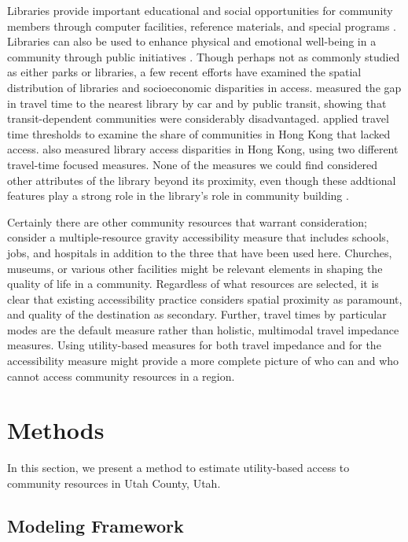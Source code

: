 \documentclass[ijerph,article,submit,moreauthors,pdftex]{mdpi}
\begin{document}
Libraries provide important educational and social opportunities for community
members through computer facilities, reference materials, and special programs
\citep{maxwell2008libraries, barclay2017space}. Libraries can also be used to
enhance physical and emotional well-being in a community through public
initiatives \citep{philbin2019}. Though perhaps not as commonly studied as either
parks or libraries, a few recent efforts have examined the spatial distribution
of libraries and socioeconomic disparities in access. \citet{allen2019} measured the
gap in travel time to the nearest library by car and by public transit, showing
that transit-dependent communities were considerably disadvantaged. \citet{cheng2021}
applied travel time thresholds to examine the share of communities in Hong Kong
that lacked access. \citet{guo2017} also measured library access disparities in Hong Kong,
using two different travel-time focused measures. None of the measures we could
find considered other attributes of the library beyond its proximity, even though
these addtional features play a strong role in the library's role in community building
\citep{barclay2017space}.

Certainly there are other community resources that warrant consideration;
\citet{ermagun2020} consider a multiple-resource gravity accessibility measure that
includes schools, jobs, and hospitals in addition to the three that have been used here.
Churches, museums, or various other facilities might be relevant elements
in shaping the quality of life in a community. Regardless of what resources
are selected, it is clear that existing accessibility practice considers spatial
proximity as paramount, and quality of the destination as secondary. Further,
travel times by particular modes are the default measure rather than holistic,
multimodal travel impedance measures. Using utility-based measures for both
travel impedance and for the accessibility measure might provide a more
complete picture of who can and who cannot access community resources in a region.

\hypertarget{methods}{%
\section{Methods}\label{methods}}

In this section, we present a method to estimate utility-based access to
community resources in Utah County, Utah.

\hypertarget{framework}{%
\subsection{Modeling Framework}\label{framework}}
\end{document}
